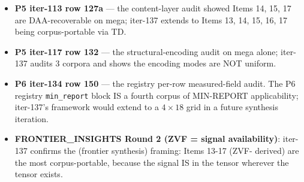 \begin{itemize}
  \item \textbf{P5 iter-113 row 127a} --- the content-layer audit showed
    Items 14, 15, 17 are DAA-recoverable on mega; iter-137 extends to
    Items 13, 14, 15, 16, 17 being corpus-portable via TD.
  \item \textbf{P5 iter-117 row 132} --- the structural-encoding audit on
    mega alone; iter-137 audits 3 corpora and shows the encoding modes are
    NOT uniform.
  \item \textbf{P6 iter-134 row 150} --- the registry per-row measured-field
    audit. The P6 registry \texttt{min\_report} block IS a fourth corpus
    of MIN-REPORT applicability; iter-137's framework would extend to a
    $4 \times 18$ grid in a future synthesis iteration.
  \item \textbf{FRONTIER\_INSIGHTS Round 2 (ZVF = signal availability)}:
    iter-137 confirms the (frontier synthesis) framing: Items 13-17 (ZVF-
    derived) are the most corpus-portable, because the signal IS in the
    tensor wherever the tensor exists.
\end{itemize}